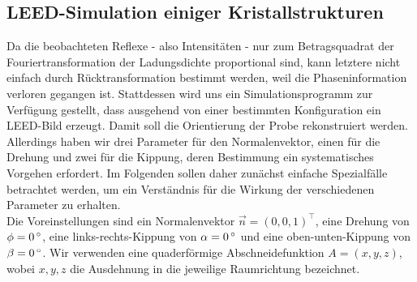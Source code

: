 \documentclass[german, parskip=full]{scrartcl}
\begin{document}
\subsection{LEED-Simulation einiger Kristallstrukturen}
Da die beobachteten Reflexe - also Intensitäten - nur zum Betragsquadrat der Fouriertransformation der Ladungsdichte proportional sind, kann letztere nicht einfach durch Rücktransformation bestimmt werden, weil die Phaseninformation verloren gegangen ist. Stattdessen wird uns ein Simulationsprogramm zur Verfügung gestellt, dass ausgehend von einer bestimmten Konfiguration ein LEED-Bild erzeugt. Damit soll die Orientierung der Probe rekonstruiert werden. Allerdings haben wir drei Parameter für den Normalenvektor, einen für die Drehung und zwei für die Kippung, deren Bestimmung ein systematisches Vorgehen erfordert. Im Folgenden sollen daher zunächst einfache Spezialfälle betrachtet werden, um ein Verständnis für die Wirkung der verschiedenen Parameter zu erhalten.\\
Die Voreinstellungen sind ein Normalenvektor $\vec{n}=(0,0,1)^\top$, eine Drehung von $\phi=0\,\degree$, eine links-rechts-Kippung von $\alpha=0\,\degree$ und eine oben-unten-Kippung von $\beta=0\,\degree$. Wir verwenden eine quaderförmige Abschneidefunktion $A=(x,y,z)$, wobei $x,y,z$ die Ausdehnung in die jeweilige Raumrichtung bezeichnet.
\end{document}

